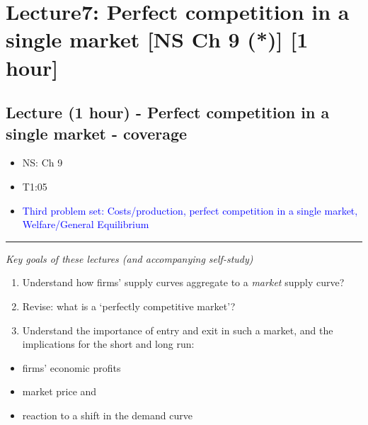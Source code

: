 \documentclass[]{article}
\providecommand{\tightlist}{%
  \setlength{\itemsep}{0pt}\setlength{\parskip}{0pt}}
\begin{document}
\hypertarget{lecture7-perfect-competition-in-a-single-market-ns-ch-9-1-hour}{%
\section{Lecture7: Perfect competition in a single market {[}NS Ch 9
(*){]} {[}1
hour{]}}\label{lecture7-perfect-competition-in-a-single-market-ns-ch-9-1-hour}}

\hypertarget{lecture-1-hour---perfect-competition-in-a-single-market---coverage}{%
\subsection{Lecture (1 hour) - Perfect competition in a single market -
coverage}\label{lecture-1-hour---perfect-competition-in-a-single-market---coverage}}

\begin{itemize}
\item
  NS: Ch 9
\item
  T1:05
\item
  \textcolor{blue}{Third problem set: Costs/production, perfect competition in a single market, Welfare/General Equilibrium }
\end{itemize}

\begin{center}\rule{0.5\linewidth}{\linethickness}\end{center}

\emph{Key goals of these lectures (and accompanying self-study)}

\begin{enumerate}
\def\labelenumi{\arabic{enumi}.}
\tightlist
\item
  Understand how firms' supply curves aggregate to a \emph{market}
  supply curve?
\item
  Revise: what is a `perfectly competitive market'?
\item
  Understand the importance of entry and exit in such a market, and the
  implications for the short and long run:
\end{enumerate}

\begin{itemize}
\tightlist
\item
  firms' economic profits
\item
  market price and
\item
  reaction to a shift in the demand curve
\end{itemize}
\end{document}
